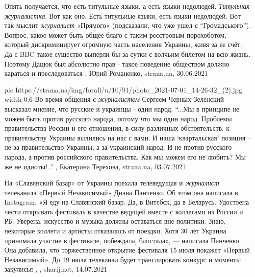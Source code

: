 Опять получается, что есть титульные языки, а есть языки недолюдей.
\emph{Титульная журналистка}.  Вот как оно. Есть титульные языки, есть языки
недолюдей. Вот так мыслит \emph{журналист} «Прямого» (подсказали, что уже ушел
с \enquote{Громадського}). Вопрос, какое может быть общее благо с таким ресстровым
порохоботом, который дискриминирует огромную часть населения Украины, живя за
ее счёт. Да с BBC такое существо выперли бы за сутки с волчьим билетом на всю
жизнь. Поэтому Дацюк был абсолютно прав - такое поведение обществом должно
караться и преследоваться
, Юрий Романенко, strana.ua, 30.06.2021

\ifcmt
  pic https://strana.ua/img/forall/u/10/91/photo_2021-07-01_14-26-32_(2).jpg
  width 0.6
\fi
Во время общения с \emph{журналистом} Сергеем Черных Зеленский высказал мнение, что русские и украинцы - один народ.  
\enquote{...Мы в принципе не можем быть против русского народа, потому что мы один
народ. Проблемы правительства России и его отношения, в силу различных
обстоятельств, к правительству Украины вылились на нас с вами. И наша
\enquote{квартальская} позиция – не за правительство Украины, а за украинский народ. И
не против русского народа, а против российского правительства. Как мы можем его
не любить? Мы же не идиоты!..}
, 
Екатерина Терехова, strana.ua, 03.07.2021

На «Славянский базар» от Украины поехала телеведущая и \emph{журналист}
телеканала «Первый Независимый» Диана Панченко. Об этом она написала в
Instagram.  «Я еду на Славянский базар. Да, в Витебск, да в Беларусь. Удостоена
чести открывать фестиваль в качестве ведущей вместе с коллегами из России и РБ.
Уверена, искусство и музыка должны оставаться вне политики. Знаю, некоторые
коллеги и артисты отказались от поездки. Хотя 30 лет Украина принимала участие
в фестивале, побеждала, блистала», — написала Панченко.  Она добавила, что
торжественное открытие фестиваля 15 июля покажет «Первый Независимый». До 19
июля телеканал будет транслировать конкурс и моменты закулисья
, 
, sharij.net, 14.07.2021


